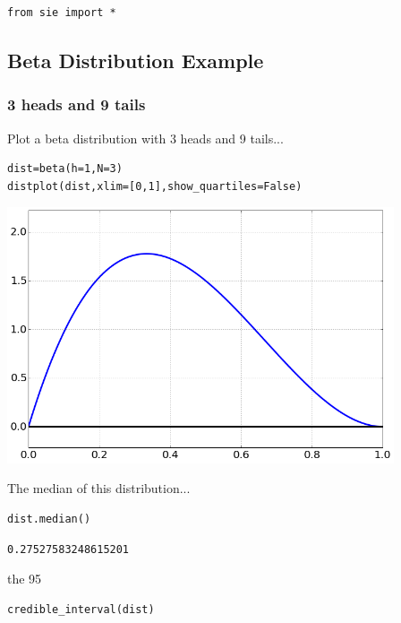 \begin{lstlisting}
from sie import *
\end{lstlisting}

\subsection{Beta Distribution Example}


\subsubsection{3 heads and 9 tails}


Plot a beta distribution with 3 heads and 9 tails...

\begin{lstlisting}
dist=beta(h=1,N=3)
distplot(dist,xlim=[0,1],show_quartiles=False)
\end{lstlisting}

\begin{center}\includegraphics[width=4.5in]{Introduction_to_Parameter_Estimation/Introduction_to_Parameter_Estimation_fig0.png}\end{center}

The median of this distribution...

\begin{lstlisting}
dist.median()
\end{lstlisting}

\begin{verbatim}
0.27527583248615201
\end{verbatim}

the 95%

\begin{lstlisting}
credible_interval(dist)
\end{lstlisting}

